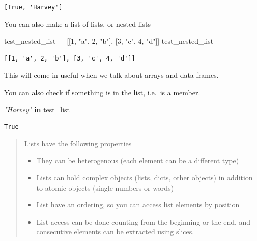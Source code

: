 \documentclass[
  letterpaper,
]{scrbook}
\newenvironment{Shaded}{\begin{snugshade}}{\end{snugshade}}
\newcommand{\CommentTok}[1]{\textcolor[rgb]{0.56,0.35,0.01}{\textit{#1}}}
\newcommand{\DecValTok}[1]{\textcolor[rgb]{0.00,0.00,0.81}{#1}}
\newcommand{\KeywordTok}[1]{\textcolor[rgb]{0.13,0.29,0.53}{\textbf{#1}}}
\newcommand{\NormalTok}[1]{#1}
\newcommand{\OperatorTok}[1]{\textcolor[rgb]{0.81,0.36,0.00}{\textbf{#1}}}
\newcommand{\StringTok}[1]{\textcolor[rgb]{0.31,0.60,0.02}{#1}}
\providecommand{\tightlist}{%
  \setlength{\itemsep}{0pt}\setlength{\parskip}{0pt}}
\begin{document}
\begin{verbatim}
[True, 'Harvey']
\end{verbatim}

You can also make a list of lists, or nested lists

\begin{Shaded}
\begin{Highlighting}[]
\NormalTok{test_nested_list }\OperatorTok{=}\NormalTok{ [[}\DecValTok{1}\NormalTok{, }\StringTok{"a"}\NormalTok{, }\DecValTok{2}\NormalTok{, }\StringTok{"b"}\NormalTok{], [}\DecValTok{3}\NormalTok{, }\StringTok{"c"}\NormalTok{, }\DecValTok{4}\NormalTok{, }\StringTok{"d"}\NormalTok{]]}
\NormalTok{test_nested_list}
\end{Highlighting}
\end{Shaded}

\begin{verbatim}
[[1, 'a', 2, 'b'], [3, 'c', 4, 'd']]
\end{verbatim}

This will come in useful when we talk about arrays and data frames.

You can also check if something is in the list, i.e.~is a member.

\begin{Shaded}
\begin{Highlighting}[]
\CommentTok{"Harvey"} \KeywordTok{in}\NormalTok{ test_list}
\end{Highlighting}
\end{Shaded}

\begin{verbatim}
True
\end{verbatim}

\begin{quote}
Lists have the following properties

\begin{itemize}
\tightlist
\item
  They can be heterogenous (each element can be a different type)
\item
  Lists can hold complex objects (lists, dicts, other objects) in addition to atomic objects (single numbers or words)
\item
  List have an ordering, so you can access list elements by position
\item
  List access can be done counting from the beginning or the end, and consecutive elements can be extracted using slices.
\end{itemize}
\end{quote}
\end{document}
